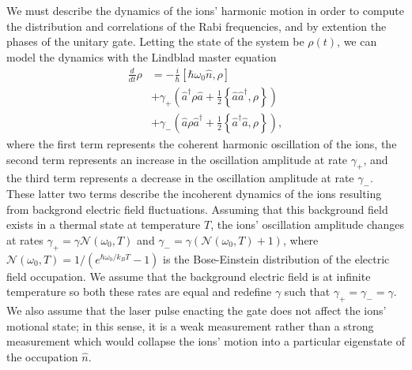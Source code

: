 \documentclass[prx,aps,twocolumn,showpacs,superscriptaddress,10pt]{revtex4-1}
\begin{document}
We must describe the dynamics of the ions' harmonic motion in order to compute the distribution and correlations of the Rabi frequencies, and by extention the phases of the unitary gate. Letting the state of the system be $\rho\left(t\right)$, we can model the dynamics with the Lindblad master equation
\begin{align}\label{eq:masterEq}
	\frac{d}{dt}\rho &= -\frac{i}{\hbar}\left[\hbar\omega_{0}\hat{n},\rho\right]\nonumber\\
							&+ \gamma_{+}\left(\hat{a}^{\dagger}\rho\hat{a}+\frac{1}{2}\left\{\hat{a}\hat{a}^{\dagger},\rho\right\}\right)\nonumber\\
							&+ \gamma_{-}\left(\hat{a}\rho\hat{a}^{\dagger}+\frac{1}{2}\left\{\hat{a}^{\dagger}\hat{a},\rho\right\}\right),
\end{align}
where the first term represents the coherent harmonic oscillation of the ions, the second term represents an increase in the oscillation amplitude at rate $\gamma_{+}$, and the third term represents a decrease in the oscillation amplitude at rate $\gamma_{-}$. These latter two terms describe the incoherent dynamics of the ions resulting from backgrond electric field fluctuations. Assuming that this background field exists in a thermal state at temperature $T$, the ions' oscillation amplitude changes at rates $\gamma_{+}=\gamma\mathcal{N}\left(\omega_{0},T\right)$ and $\gamma_{-}=\gamma\left(\mathcal{N}\left(\omega_{0},T\right)+1\right)$, where $\mathcal{N}\left(\omega_{0},T\right)=1/\left(e^{\hbar\omega_{0}/k_{B}T}-1\right)$ is the Bose-Einstein distribution of the electric field occupation. We assume that the background electric field is at infinite temperature so both these rates are equal and redefine $\gamma$ such that $\gamma_{+}=\gamma_{-}=\gamma$. We also assume that the laser pulse enacting the gate does not affect the ions' motional state; in this sense, it is a weak measurement rather than a strong measurement which would collapse the ions' motion into a particular eigenstate of the occupation $\hat{n}$.
\end{document}
